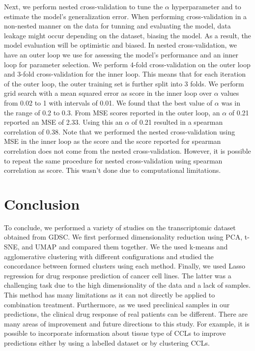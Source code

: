 \documentclass[12pt, letterpaper]{article}
\begin{document}
Next, we perform nested cross-validation to tune the $\alpha$ hyperparameter and to estimate the model's generalization error. When performing cross-validation in a non-nested manner on the data for tunning and evaluating the model, data leakage might occur depending on the dataset, biasing the model. As a result, the model evaluation will be optimistic and biased. In nested cross-validation, we have an outer loop we use for assessing the model's performance and an inner loop for parameter selection. We perform 4-fold cross-validation on the outer loop and 3-fold cross-validation for the inner loop. This means that for each iteration of the outer loop, the outer training set is further split into 3 folds. We perform grid search with a mean squared error as score in the inner loop over $\alpha$ values from 0.02 to 1 with intervals of 0.01. We found that the best value of $\alpha$ was in the range of 0.2 to 0.3. From MSE scores reported in the outer loop, an $\alpha$ of 0.21 reported an MSE of 2.33. Using this an $\alpha$ of 0.21 resulted in a spearman correlation of 0.38. Note that we performed the nested cross-validation using MSE in the inner loop as the score and the score reported for spearman correlation does not come from the nested cross-validation. However, it is possible to repeat the same procedure for nested cross-validation using spearman correlation as score. This wasn't done due to computational limitations. 

 \section*{Conclusion}
 To conclude, we performed a variety of studies on the transcriptomic dataset obtained from GDSC. We first performed dimensionality reduction using PCA, t-SNE, and UMAP and compared them together. We the used k-means and agglomerative clustering with different configurations and studied the concordance between formed clusters using each method. Finally, we used Lasso regression for drug response prediction of cancer cell lines. The latter was a challenging task due to the high dimensionality of the data and a lack of samples. This method has many limitations as it can not directly be applied to combination treatment. Furthermore, as we used preclinical samples in our predictions, the clinical drug response of real patients can be different. There are many areas of improvement and future directions to this study. For example, it is possible to incorporate information about tissue type of CCLs to improve predictions either by using a labelled dataset or by clustering CCLs.
 \newpage
 
 

 
\end{document}
